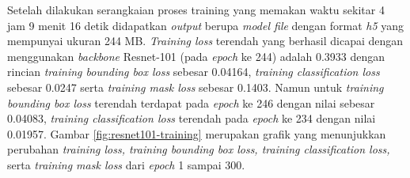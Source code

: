 Setelah dilakukan serangkaian proses training yang memakan waktu sekitar 4 jam 9 menit 16 detik didapatkan \textit{output} berupa \textit{model file}  dengan format \textit{h5} yang mempunyai ukuran 244 MB. \textit{Training loss} terendah yang berhasil dicapai dengan menggunakan \textit{backbone} Resnet-101 (pada \textit{epoch} ke 244) adalah 0.3933 dengan rincian \textit{training bounding box loss} sebesar 0.04164, \textit{training classification loss} sebesar 0.0247 serta \textit{training mask loss} sebesar 0.1403. Namun untuk \textit{training bounding box loss} terendah terdapat pada \textit{epoch} ke 246 dengan nilai sebesar 0.04083, \textit{training classification loss} terendah pada \textit{epoch} ke 234 dengan nilai 0.01957. Gambar \ref{fig:resnet101-training} merupakan grafik yang menunjukkan perubahan \textit{training loss, training bounding box loss, training classification loss,} serta \textit{training mask loss} dari \textit{epoch} 1 sampai 300. 

\newpage

